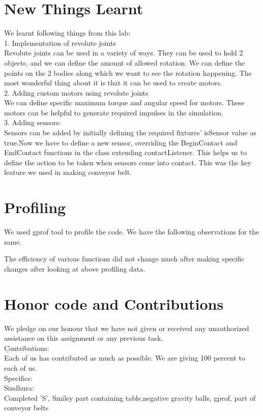 \documentclass{report}
\begin{document}
\section{New Things Learnt}
We learnt following things from this lab:\\
1. Implementation of revolute joints\\
 	Revolute joints can be used in a variety of ways. They can be used to hold 2 objects, and we can define the amount of allowed rotation. We can define the points on the 2 bodies along which we want to see the rotation happening. The most wonderful thing about it is that it can be used to create motors.\\
2. Adding custom motors using revolute joints\\
 We can define specific maximum torque and angular speed for motors. These motors can be helpful to generate required impulses in the simulation.\\
3. Adding sensors:\\
	Sensors can be added by initially defining the required fixtures' isSensor value as true.Now we have to define a new sensor, overriding the BeginContact and EndContact functions in the class extending contactListener. This helps us to define the action to 
be taken when sensors come into contact. This was the key feature we used in making conveyor belt.\\
\newpage
\section{Profiling}
We used gprof tool to profile the code. We have the following observations for the same.


The efficiency of various functions did not change much after making specific changes after looking at above profiling data. 
\newpage
\section{Honor code and Contributions}
We pledge on our honour that we have not given or received any unauthorized assistance on this assignment or any previous task.\\

{\b Contributions}:\\
Each of us has contributed as much as possible. We are giving 100 percent to each of us.\\
Specifics:\\

Sindhura: \\
Completed 'S', Smiley part containing table,negative gravity balls, gprof, part of conveyor belts\\
\end{document}

